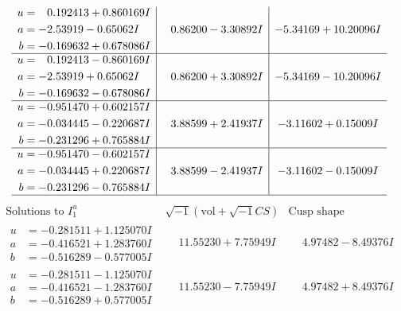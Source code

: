 \documentclass[1p]{elsarticle_modified}
\theoremstyle{definition}
\newcommand{\I}{\sqrt{-1}}
\begin{document}
$$\begin{array}{c|c|c}
\begin{aligned}
u &= \phantom{-}0.192413 + 0.860169 I \\
a &= -2.53919 - 0.65062 I \\
b &= -0.169632 + 0.678086 I\end{aligned}
 & \phantom{-}0.86200 - 3.30892 I & -5.34169 + 10.20096 I \\ \hline\begin{aligned}
u &= \phantom{-}0.192413 - 0.860169 I \\
a &= -2.53919 + 0.65062 I \\
b &= -0.169632 - 0.678086 I\end{aligned}
 & \phantom{-}0.86200 + 3.30892 I & -5.34169 - 10.20096 I \\ \hline\begin{aligned}
u &= -0.951470 + 0.602157 I \\
a &= -0.034445 - 0.220687 I \\
b &= -0.231296 + 0.765884 I\end{aligned}
 & \phantom{-}3.88599 + 2.41937 I & -3.11602 + 0.15009 I \\ \hline\begin{aligned}
u &= -0.951470 - 0.602157 I \\
a &= -0.034445 + 0.220687 I \\
b &= -0.231296 - 0.765884 I\end{aligned}
 & \phantom{-}3.88599 - 2.41937 I & -3.11602 - 0.15009 I\\
 \hline 
 \end{array}$$\newpage$$\begin{array}{c|c|c}  
\text{Solutions to }I^u_{1}& \I (\text{vol} + \sqrt{-1}CS) & \text{Cusp shape}\\
 \hline 
\begin{aligned}
u &= -0.281511 + 1.125070 I \\
a &= -0.416521 + 1.283760 I \\
b &= -0.516289 - 0.577005 I\end{aligned}
 & \phantom{-}11.55230 + 7.75949 I & \phantom{-}4.97482 - 8.49376 I \\ \hline\begin{aligned}
u &= -0.281511 - 1.125070 I \\
a &= -0.416521 - 1.283760 I \\
b &= -0.516289 + 0.577005 I\end{aligned}
 & \phantom{-}11.55230 - 7.75949 I & \phantom{-}4.97482 + 8.49376 I \\ \hline\begin{aligned}

\end{aligned}
\end{array}$$
\end{document}
